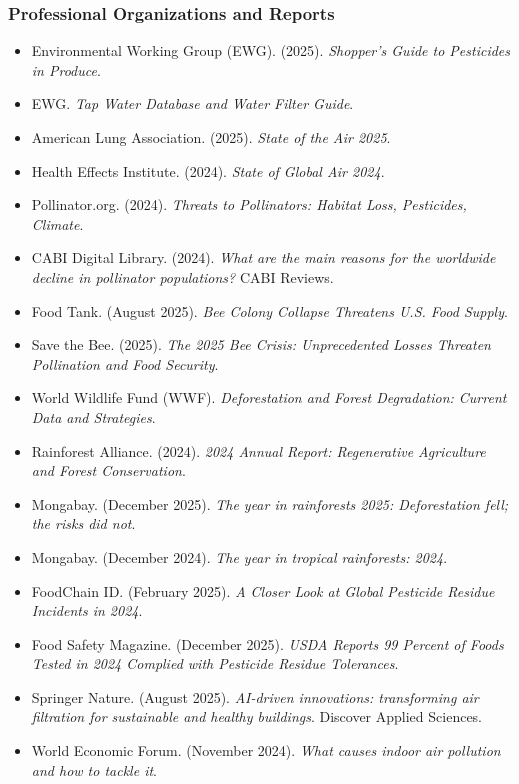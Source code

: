 \documentclass[11pt,letterpaper]{article}
\begin{document}
\subsubsection{Professional Organizations and Reports}
\begin{itemize}[leftmargin=*]
  \item Environmental Working Group (EWG). (2025). \textit{Shopper's Guide to Pesticides in Produce}.
  \item EWG. \textit{Tap Water Database and Water Filter Guide}.
  \item American Lung Association. (2025). \textit{State of the Air 2025}.
  \item Health Effects Institute. (2024). \textit{State of Global Air 2024}.
  \item Pollinator.org. (2024). \textit{Threats to Pollinators: Habitat Loss, Pesticides, Climate}.
  \item CABI Digital Library. (2024). \textit{What are the main reasons for the worldwide decline in pollinator populations?} CABI Reviews.
  \item Food Tank. (August 2025). \textit{Bee Colony Collapse Threatens U.S. Food Supply}.
  \item Save the Bee. (2025). \textit{The 2025 Bee Crisis: Unprecedented Losses Threaten Pollination and Food Security}.
  \item World Wildlife Fund (WWF). \textit{Deforestation and Forest Degradation: Current Data and Strategies}.
  \item Rainforest Alliance. (2024). \textit{2024 Annual Report: Regenerative Agriculture and Forest Conservation}.
  \item Mongabay. (December 2025). \textit{The year in rainforests 2025: Deforestation fell; the risks did not}.
  \item Mongabay. (December 2024). \textit{The year in tropical rainforests: 2024}.
  \item FoodChain ID. (February 2025). \textit{A Closer Look at Global Pesticide Residue Incidents in 2024}.
  \item Food Safety Magazine. (December 2025). \textit{USDA Reports 99 Percent of Foods Tested in 2024 Complied with Pesticide Residue Tolerances}.
  \item Springer Nature. (August 2025). \textit{AI-driven innovations: transforming air filtration for sustainable and healthy buildings}. Discover Applied Sciences.
  \item World Economic Forum. (November 2024). \textit{What causes indoor air pollution and how to tackle it}.
\end{itemize}
\end{document}
